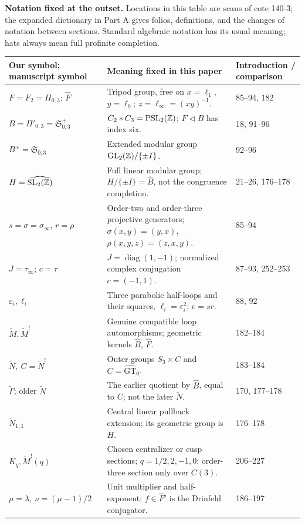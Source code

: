 \noindent\textbf{Notation fixed at the outset.} Locations in this table are scans of
cote 140-3; the expanded dictionary in Part A gives folios, definitions, and
the changes of notation between sections. Standard algebraic notation has its
usual meaning; hats always mean full profinite completion.
\begin{center}
\begingroup\small\setlength{\tabcolsep}{4pt}\renewcommand{\arraystretch}{1.02}
\begin{tabularx}{\textwidth}{p{}Xp{}}
\toprule
Our symbol; manuscript symbol&Meaning fixed in this paper&Introduction / comparison\\\midrule
$F=F_2=\Pi_{0,3}$; $\widehat F$&Tripod group, free on $x=\ell_1$, $y=\ell_0$; $z=\ell_\infty=(xy)^{-1}$.&85--94, 182\\
$B=\Pi'_{0,3}=\mathfrak S^+_{0,3}$&$C_2*C_3=\operatorname{PSL}_2(\mathbb Z)$; $F\triangleleft B$ has index six.&18, 91--96\\
$B^\pm=\mathfrak S_{0,3}$&Extended modular group $\operatorname{GL}_2(\mathbb Z)/\{\pm I\}$.&92--96\\
$H=\widehat{\operatorname{SL}_2(\mathbb Z)}$&Full linear modular group; $H/\{\pm I\}=\widehat B$, not the congruence completion.&21--26, 176--178\\
$s=\sigma=\sigma_\infty$, $r=\rho$&Order-two and order-three projective generators; $\sigma(x,y)=(y,x)$, $\rho(x,y,z)=(z,x,y)$.&85--94\\
$J=\tau_\infty$; $c=\tau$&$J=\operatorname{diag}(1,-1)$; normalized complex conjugation $c=(-1,1)$.&87--93, 252--253\\
$\varepsilon_i,\ell_i$&Three parabolic half-loops and their squares, $\ell_i=\varepsilon_i^2$; $e=sr$.&88, 92\\
$\widetilde M,\widetilde M^!$&Genuine compatible loop automorphisms; geometric kernels $\widehat B$, $\widehat F$.&182--184\\
$\widetilde N,\ C=\widetilde N^!$&Outer groups $S_3\times C$ and $C=\widehat{\mathrm{GT}}_0$.&183--184\\
$\widetilde\Gamma$; older $\widetilde N$&The earlier quotient by $\widehat B$, equal to $C$; not the later $\widetilde N$.&170, 177--178\\
$\widetilde N_{1,1}$&Central linear pullback extension; its geometric group is $H$.&176--178\\
$K_q,\widetilde M^!(q)$&Chosen centralizer or cusp sections; $q=1/2,2,-1,0$; order-three section only over $C(3)$.&206--227\\
$\mu=\lambda,\ \nu=(\mu-1)/2$&Unit multiplier and half-exponent; $f\in\widehat F'$ is the Drinfeld conjugator.&186--197\\

\end{tabularx}
\end{center}

